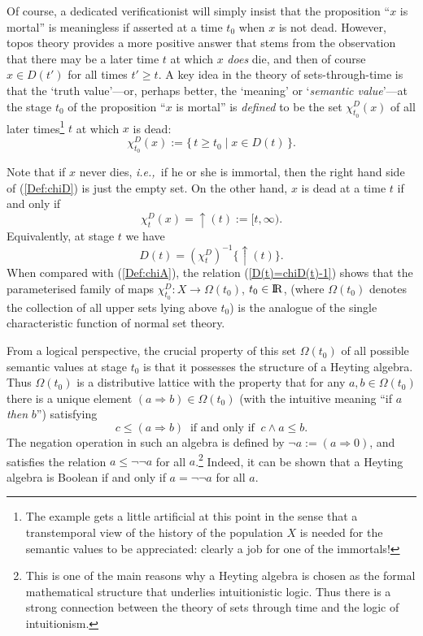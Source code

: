 \documentclass[12pt]{article}
\newcounter{def-number}[section]
\newcommand{\beq}{\begin{equation}}
\newcommand{\eeq}{\end{equation}}
\newcommand{\eq}[1]{(\ref{#1})}
\newcommand{\ie}{{\em i.e.,\ }}
\newcommand{\map}{\rightarrow}
\newcommand{\up}[1]{\uparrow\!\!(#1)}
\newcommand{\mathR}{{\rm I\! R}}                %
\newcommand{\Om}{\Omega}
\begin{document}
	Of course, a dedicated verificationist will simply insist that
the proposition ``$x$ is mortal'' is meaningless if asserted at a
time $t_0$ when $x$ is not dead. However, topos theory provides a
more positive answer that stems from the observation that there may
be a later time $t$ at which $x$ {\em does\/} die, and then of
course $x\in D(t')$ for all times $t'\geq t$. A key idea in the
theory of sets-through-time is that the `truth value'---or, perhaps
better, the `meaning' or `{\em semantic value\/}'---at the stage
$t_0$ of the proposition ``$x$ is mortal'' is {\em defined\/} to be
the set $\chi^D_{t_0}(x)$ of all later times\footnote{The example
gets a little artificial at this point in the sense that a
transtemporal view of the history of the population $X$ is needed
for the semantic values to be appreciated: clearly a job for one of
the immortals!} $t$ at which $x$ is dead:
\beq	
	\chi^D_{t_0}(x):=\{\,t\geq t_0\mid x\in D(t)\,\}.	\label{Def:chiD}  
\eeq

	Note that if $x$ never dies, \ie if he or she is immortal, then
the right hand side of \eq{Def:chiD} is just the empty set. On the
other hand, $x$ is dead at a time $t$ if and only if
\beq
		\chi^D_t(x)=\up{t}:=[t,\infty).		\label{chiDt=up(t)}
\eeq
Equivalently, at stage $t$ we have
\beq
		D(t)=(\chi^D_t)^{-1}\{\up{t}\}.	\label{D(t)=chiD(t)-1}
\eeq
When compared with \eq{Def:chiA}, the relation \eq{D(t)=chiD(t)-1}
shows that the parameterised family of maps
$\chi^D_{t_0}:X\map\Om(t_0)$, $t_0\in\mathR$, (where $\Om(t_0)$
denotes the collection of all upper sets lying above $t_0$) is the
analogue of the single characteristic function of normal set theory.

	From a logical perspective, the crucial property of this set
$\Om(t_0)$ of all possible semantic values at stage $t_0$ is that it
possesses the structure of a Heyting algebra. Thus $\Om(t_0)$ is a
distributive lattice with the property that for any $a,b\in\Om(t_0)$
there is a unique element $(a\Rightarrow b)\in\Om(t_0)$ (with the
intuitive meaning ``if $a$ {\em then\/} $b$'') satisfying
\beq
			c\leq(a\Rightarrow b)\ \mbox{ if and only if }\ 
					c\land a\leq b.
\eeq
The negation operation in such an algebra is defined by $\neg
a:=(a\Rightarrow0)$, and satisfies the relation $a\leq\neg\neg a$
for all $a$.\footnote{This is one of the main reasons why a Heyting
algebra is chosen as the formal mathematical structure that
underlies intuitionistic logic. Thus there is a strong connection
between the theory of sets through time and the logic of
intuitionism.} Indeed, it can be shown that a Heyting algebra is
Boolean if and only if $a=\neg\neg a$ for all $a$.
\end{document}
